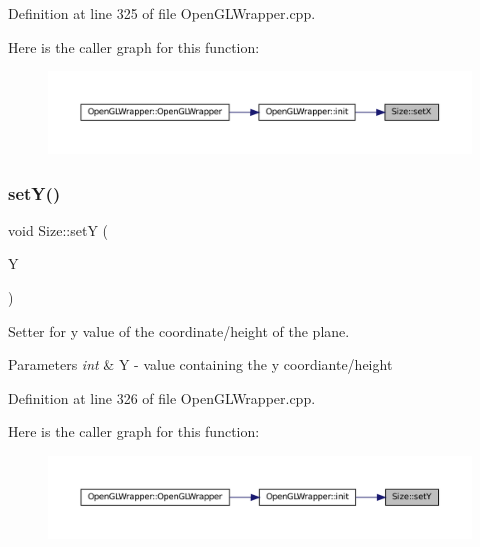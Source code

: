 Definition at line 325 of file Open\+G\+L\+Wrapper.\+cpp.

Here is the caller graph for this function\+:\nopagebreak
\begin{figure}[H]
\begin{center}
\leavevmode
\includegraphics[width=350pt]{classSize_a555a455ea033f7ec3173c9bda30a896d_icgraph}
\end{center}
\end{figure}
\mbox{\label{classSize_a75d2ff298be7d32a4e2d37f05b5f8c92}} 
\subsubsection{\texorpdfstring{setY()}{setY()}}
{\footnotesize\ttfamily void Size\+::setY (\begin{DoxyParamCaption}\item[{int}]{Y }\end{DoxyParamCaption})}



Setter for y value of the coordinate/height of the plane. 


\begin{DoxyParams}{Parameters}
{\em int} & Y -\/ value containing the y coordiante/height \\
\hline
\end{DoxyParams}


Definition at line 326 of file Open\+G\+L\+Wrapper.\+cpp.

Here is the caller graph for this function\+:\nopagebreak
\begin{figure}[H]
\begin{center}
\leavevmode
\includegraphics[width=350pt]{classSize_a75d2ff298be7d32a4e2d37f05b5f8c92_icgraph}
\end{center}
\end{figure}


